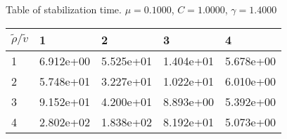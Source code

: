 \begin{center}
Table of stabilization time. $\mu = 0.1000$, $C = 1.0000$, $\gamma = 1.4000$
  
\begin{tabular}{|p{0.8in}|p{0.8in}|p{0.8in}|p{0.8in}|p{0.8in}|} \hline
$\tilde{\rho} / \tilde{v}$ &1 &2 &3 &4 \\ \hline 
1 &6.912e+00 &5.525e+01 &1.404e+01 &5.678e+00 \\ \hline 
2 &5.748e+01 &3.227e+01 &1.022e+01 &6.010e+00 \\ \hline 
3 &9.152e+01 &4.200e+01 &8.893e+00 &5.392e+00 \\ \hline 
4 &2.802e+02 &1.838e+02 &8.192e+01 &5.073e+00 \\ \hline 

\end{tabular}\\[20pt]
\end{center}
